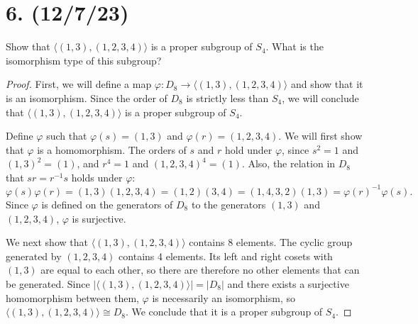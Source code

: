 \documentclass{article}
\begin{document}
\section*{6. (12/7/23)}

Show that $\langle (1, 3), (1, 2, 3, 4) \rangle$ is a proper subgroup of $S_4$. What is the isomorphism type of this subgroup?

\begin{proof}
    First, we will define a map $\varphi: D_8 \rightarrow \langle (1, 3), (1, 2, 3, 4) \rangle$ and show that it is an isomorphism. Since the order of $D_8$ is strictly less than $S_4$, we will conclude that $\langle (1, 3), (1, 2, 3, 4) \rangle$ is a proper subgroup of $S_4$.

    Define $\varphi$ such that $\varphi(s) = (1, 3)$ and $\varphi(r) = (1, 2, 3, 4)$. We will first show that $\varphi$ is a homomorphism. The orders of $s$ and $r$ hold under $\varphi$, since $s^2 = 1$ and $(1, 3)^2 = (1)$, and $r^4 = 1$ and $(1, 2, 3, 4)^4 = (1)$. Also, the relation in $D_8$ that $sr = r^{-1}s$ holds under $\varphi$:
    \begin{equation*}
        \varphi(s)\varphi(r) = (1, 3)(1, 2, 3, 4) = (1, 2)(3, 4) = (1, 4, 3, 2)(1, 3) = \varphi(r)^{-1} \varphi(s).
    \end{equation*}
    Since $\varphi$ is defined on the generators of $D_8$ to the generators $(1, 3)$ and $(1, 2, 3, 4)$, $\varphi$ is surjective.

    We next show that $\langle (1, 3), (1, 2, 3, 4) \rangle$ contains 8 elements. The cyclic group generated by $(1, 2, 3, 4)$ contains 4 elements. Its left and right cosets with $(1, 3)$ are equal to each other, so there are therefore no other elements that can be generated. Since $|\langle (1, 3), (1, 2, 3, 4) \rangle| = |D_8|$ and there exists a surjective homomorphism between them, $\varphi$ is necessarily an isomorphism, so $\langle (1, 3), (1, 2, 3, 4) \rangle \cong D_8$. We conclude that it is a proper subgroup of $S_4$.
\end{proof}
\end{document}
